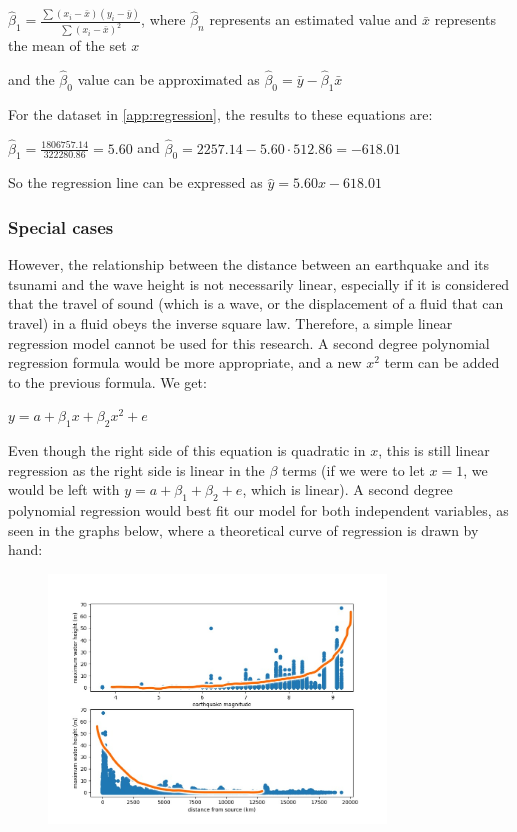 \documentclass[11pt,letterpaper]{article}
\begin{document}
$\hat \beta_1 = \frac{\sum (x_i - \bar x) (y_i - \bar y)}{\sum (x_i - \bar x)^2}$, where $\hat \beta_n$ represents an estimated value and $\bar x$ represents the mean of the set $x$

and the $\hat \beta_0$ value can be approximated as $\hat \beta_0 = \bar y - \hat \beta_1 \bar x$

For the dataset in \ref{app:regression}, the results to these equations are:

$\hat \beta_1 = \frac{1806757.14}{322280.86} = 5.60$ and $\hat \beta_0 = 2257.14 - 5.60 \cdot 512.86 = -618.01$

So the regression line can be expressed as $\boxed{ \hat y = 5.60 x -618.01}$

\subsubsection{Special cases}

However, the relationship between the distance between an earthquake and its tsunami and the wave height is not necessarily linear, especially if it is considered that the travel of sound (which is a wave, or the displacement of a fluid that can travel) in a fluid obeys the inverse square law. Therefore, a simple linear regression model cannot be used for this research. A second degree polynomial regression formula would be more appropriate, and a new $x^2$ term can be added to the previous formula. We get:

$y = a + \beta_1 x + \beta_2 x^2 + e$

Even though the right side of this equation is quadratic in $x$, this is still linear regression as the right side is linear in the $\beta$ terms (if we were to let $x = 1$, we would be left with $y = a + \beta_1 + \beta_2 + e$, which is linear). A second degree polynomial regression would best fit our model for both independent variables, as seen in the graphs below, where a theoretical curve of regression is drawn by hand:

\begin{figure}[H]
    \centering
    \includegraphics[width=0.8\textwidth]{modelshowcase.jpeg}
    \label{fig:boat1}
\end{figure}
\end{document}

